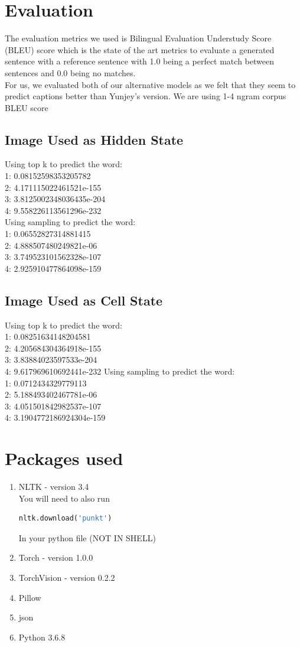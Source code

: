 \documentclass{proc}
\begin{document}
\section{Evaluation}
The evaluation metrics we used is Bilingual Evaluation Understudy Score (BLEU) score which is the state of the art metrics to evaluate a generated sentence with a reference sentence with 1.0 being a perfect match between sentences and 0.0 being no matches.\\
For us, we evaluated both of our alternative models as we felt that they seem to predict captions better than Yunjey's version. We are using 1-4 ngram corpus BLEU score\\
\subsection{Image Used as Hidden State}
Using top k to predict the word:\\
1: 0.08152598353205782\\
2: 4.171115022461521e-155\\
3: 3.8125002348036435e-204\\
4: 9.558226113561296e-232\\
Using sampling to predict the word:\\
1: 0.06552827314881415\\
2: 4.888507480249821e-06\\
3: 3.749523101562328e-107\\
4: 2.925910477864098e-159
\subsection{Image Used as Cell State}
Using top k to predict the word:\\
1: 0.08251634148204581\\
2: 4.205684304364918e-155\\
3: 3.83884023597533e-204\\
4: 9.617969610692441e-232
Using sampling to predict the word:\\
1: 0.0712434329779113\\
2: 5.188493402467781e-06\\
3: 4.051501842982537e-107\\
4: 3.1904772186924304e-159

\section{Packages used}
\begin{enumerate}
\item NLTK - version 3.4 \\
You will need to also run 
\begin{lstlisting}[language=python]
nltk.download('punkt')
\end{lstlisting}
In your python file (NOT IN SHELL)
\item Torch - version 1.0.0
\item TorchVision - version 0.2.2
\item Pillow
\item json
\item Python 3.6.8
\end{enumerate}
\end{document}

